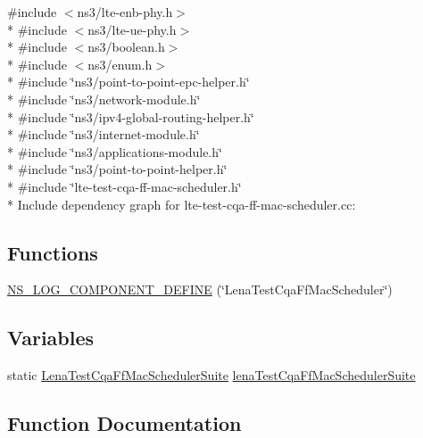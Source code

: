 {\ttfamily \#include $<$ns3/lte-\/enb-\/phy.\+h$>$}\\*
{\ttfamily \#include $<$ns3/lte-\/ue-\/phy.\+h$>$}\\*
{\ttfamily \#include $<$ns3/boolean.\+h$>$}\\*
{\ttfamily \#include $<$ns3/enum.\+h$>$}\\*
{\ttfamily \#include \char`\"{}ns3/point-\/to-\/point-\/epc-\/helper.\+h\char`\"{}}\\*
{\ttfamily \#include \char`\"{}ns3/network-\/module.\+h\char`\"{}}\\*
{\ttfamily \#include \char`\"{}ns3/ipv4-\/global-\/routing-\/helper.\+h\char`\"{}}\\*
{\ttfamily \#include \char`\"{}ns3/internet-\/module.\+h\char`\"{}}\\*
{\ttfamily \#include \char`\"{}ns3/applications-\/module.\+h\char`\"{}}\\*
{\ttfamily \#include \char`\"{}ns3/point-\/to-\/point-\/helper.\+h\char`\"{}}\\*
{\ttfamily \#include \char`\"{}lte-\/test-\/cqa-\/ff-\/mac-\/scheduler.\+h\char`\"{}}\\*
Include dependency graph for lte-\/test-\/cqa-\/ff-\/mac-\/scheduler.cc\+:
\subsection*{Functions}
\begin{DoxyCompactItemize}
\item 
\hyperlink{lte-test-cqa-ff-mac-scheduler_8cc_a7f744e238b66835fa32c61f9a36c343b}{N\+S\+\_\+\+L\+O\+G\+\_\+\+C\+O\+M\+P\+O\+N\+E\+N\+T\+\_\+\+D\+E\+F\+I\+NE} (\char`\"{}Lena\+Test\+Cqa\+Ff\+Mac\+Scheduler\char`\"{})
\end{DoxyCompactItemize}
\subsection*{Variables}
\begin{DoxyCompactItemize}
\item 
static \hyperlink{classLenaTestCqaFfMacSchedulerSuite}{Lena\+Test\+Cqa\+Ff\+Mac\+Scheduler\+Suite} \hyperlink{lte-test-cqa-ff-mac-scheduler_8cc_a456cffcd87d2ada5e8660bd039c919b4}{lena\+Test\+Cqa\+Ff\+Mac\+Scheduler\+Suite}
\end{DoxyCompactItemize}


\subsection{Function Documentation}
